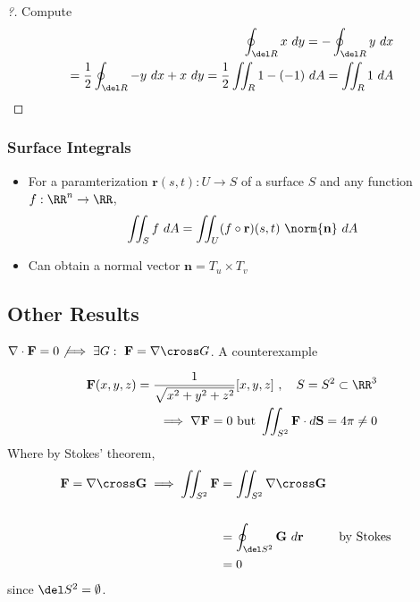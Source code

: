 \begin{proof}[?]

Compute
\begin{align*}
\oint_{\del R} x ~dy = - \oint_{\del R} y ~dx \\
= \frac{1}{2} \oint_{\del R} -y~dx + x~dy
= \frac{1}{2} \iint_R 1 - (-1) ~dA   
=\iint_R 1 ~dA 
\end{align*}

\end{proof}

\hypertarget{surface-integrals}{%
\subsubsection{Surface Integrals}\label{surface-integrals}}

\begin{itemize}
\tightlist
\item
  For a paramterization \(\mathbf r(s,t): U \to S\) of a surface \(S\)
  and any function \(f: \RR^n \to \RR\),
  \begin{align*}
  \iint _ { S } f ~dA = \iint _ { U } ( f \circ \mathbf r) ( s , t )~\norm{\mathbf n}  ~dA
  \end{align*}
\item
  Can obtain a normal vector \(\mathbf n = T _ { u } \times T _ { v }\)
\end{itemize}

\hypertarget{other-results}{%
\subsection{Other Results}\label{other-results}}

\begin{example}[?]

\(\nabla \cdot \mathbf{F} = 0 \not \implies \exists G:~ \mathbf{F} = \nabla\cross G\).
A counterexample

\begin{align*}
\mathbf{F}(x,y,z) =\frac{1}{\sqrt{x^2+y^2+z^2}}[x, y, z]~,\quad S = S^2 \subset \RR^3 \\ 
\implies \nabla \mathbf{F} = 0 \text{ but } \iint_{S^2}\mathbf{F}\cdot d\mathbf{S} = 4\pi \neq 0
\end{align*} Where by Stokes' theorem,
\begin{align*}
\mathbf{F} 
= \nabla\cross\mathbf{G}\implies
\iint_{S^2} \mathbf{F} 
&= \iint_{S^2} \nabla\cross\mathbf{G}  \\ \\
&= \oint_{\del S^2}\mathbf{G}~d\mathbf{r}  && \text{by Stokes}\\
&= 0
\end{align*} since \(\del S^2 = \emptyset\).

\end{example}

